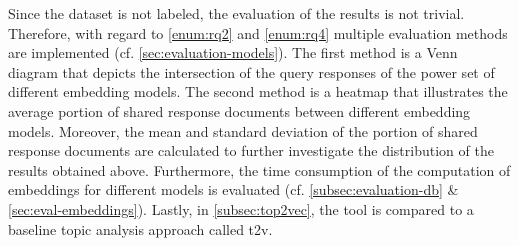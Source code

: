 Since the dataset is not labeled, the evaluation of the results is not trivial.
Therefore, with regard to \ref{enum:rq2} and \ref{enum:rq4} 
multiple evaluation methods are implemented (cf. \autoref{sec:evaluation-models}).
The first method is a Venn diagram that depicts the intersection of the query responses 
of the power set of different embedding models.
The second method is a heatmap that illustrates the average portion of shared response documents 
between different embedding models.
Moreover, the mean and standard deviation of the portion of shared response documents are calculated 
to further investigate the distribution of the results obtained above.
Furthermore, the time consumption of the computation of embeddings for different models is evaluated 
(cf. \autoref{subsec:evaluation-db} \& \autoref{sec:eval-embeddings}).
Lastly, in \autoref{subsec:top2vec}, the tool is compared to a baseline topic analysis approach called \ac{t2v}.